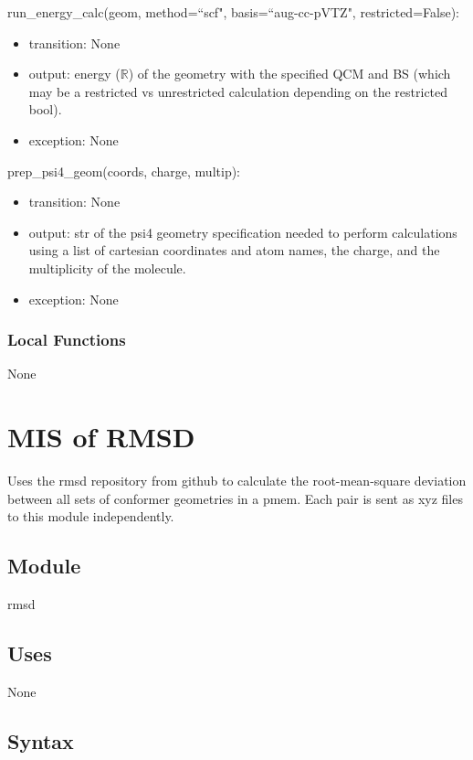\documentclass[12pt, titlepage]{article}
\begin{document}
\noindent run\_energy\_calc(geom, method=``scf", basis=``aug-cc-pVTZ",
restricted=False):
\begin{itemize}
	\item transition: None
	\item output: energy ($\mathbb{R}$) of the geometry with the specified QCM 
	and BS (which may be a restricted vs unrestricted calculation depending on 
	the restricted bool).
	\item exception: None
\end{itemize}

\noindent prep\_psi4\_geom(coords, charge, multip):
\begin{itemize}
	\item transition: None
	\item output: str of the psi4 geometry specification needed to perform 
	calculations using a list of cartesian coordinates and atom names, the 
	charge, and the multiplicity of the molecule.
	\item exception: None
\end{itemize}

\subsubsection{Local Functions}

None

\section{MIS of RMSD} \label{section-rmsd}

Uses the rmsd repository from github to calculate the root-mean-square 
deviation between all sets of conformer geometries in a pmem. Each pair is sent 
as xyz files to this module independently.

\subsection{Module}

rmsd

\subsection{Uses}

None

\subsection{Syntax}
\end{document}
